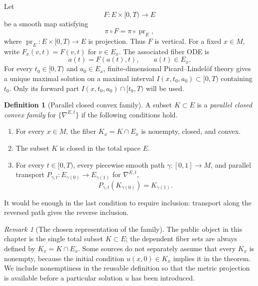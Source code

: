 \documentclass[10pt]{coll-l}
\theoremstyle{definition}
\newtheorem{definition}[theorem]{Definition}
\theoremstyle{remark}
\newtheorem{remark}[theorem]{Remark}
\numberwithin{section}{chapter}
\numberwithin{equation}{chapter}
\begin{document}
Let
\[
  F:E\times[0,T)\longrightarrow E
\]
be a smooth map satisfying
\[
   \pi\circ F=\pi\circ\operatorname{pr}_E,
\]
where $\operatorname{pr}_E:E\times[0,T)\to E$ is projection.  Thus $F$ is
vertical.  For a fixed $x\in M$, write $F_x(v,t)=F(v,t)$ for
$v\in E_x$.  The associated fiber ODE is
\begin{equation}
   \dot a(t)=F(a(t),t),\qquad a(t)\in E_x.                 \label{eq:wmp-ode}
\end{equation}
For every $t_0\in[0,T)$ and $a_0\in E_x$, finite-dimensional
Picard--Lindel\"of theory gives a unique maximal solution on a maximal
interval $I(x,t_0,a_0)\subset[0,T)$ containing $t_0$.  Only its forward
part $I(x,t_0,a_0)\cap[t_0,T)$ will be used.

\begin{definition}[Parallel closed convex family]
\label{def:wmp-parallel-convex}
A subset $K\subset E$ is a \emph{parallel closed convex family} for
$\{\nabla^{E,t}\}$ if the following conditions hold.
\begin{enumerate}
\item For every $x\in M$, the fiber
      $K_x=K\cap E_x$ is nonempty, closed, and convex.
\item The subset $K$ is closed in the total space $E$.
\item For every $t\in[0,T)$, every piecewise smooth path
      $\gamma:[0,1]\to M$, and parallel transport
      $P_{\gamma,t}:E_{\gamma(0)}\to E_{\gamma(1)}$ for
      $\nabla^{E,t}$,
      \[
          P_{\gamma,t}(K_{\gamma(0)})=K_{\gamma(1)}.
      \]
\end{enumerate}
It would be enough in the last condition to require inclusion: transport
along the reversed path gives the reverse inclusion.
\end{definition}

\begin{remark}[The chosen representation of the family]
\label{rem:wmp-total-set}
The public object in this chapter is the single total subset $K\subset E$;
the dependent fiber sets are always defined by $K_x=K\cap E_x$.  Some
sources do not separately assume that every $K_x$ is nonempty, because the
initial condition $u(x,0)\in K_x$ implies it in the theorem.  We include
nonemptiness in the reusable definition so that the metric projection is
available before a particular solution $u$ has been introduced.
\end{remark}
\end{document}
